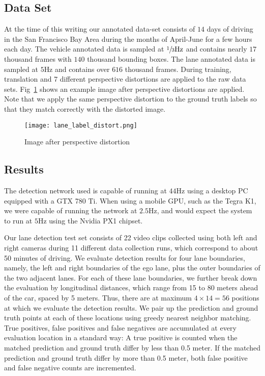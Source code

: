 \documentclass[journal]{IEEEtran}
\begin{document}
\subsection{Data Set}
At the time of this writing our annotated data-set consists of $14$ days of driving in the San Francisco Bay Area during the months of April-June for a few hours each day. The vehicle annotated data is sampled at $\sfrac{1}{3} \text{Hz}$ and contains nearly $17$ thousand frames with $140$ thousand bounding boxes. The lane annotated data is sampled at $5\text{Hz}$ and contains over $616$ thousand frames. During training, translation and 7 different perspective distortions are applied to the raw data sets. Fig~\ref{fig:lane-gt-distort} shows an example image after perspective distortions are applied. Note that we apply the same perspective distortion to the ground truth labels so that they match correctly with the distorted image.

\begin{figure}[tb]
  \centering
    \texttt{[image: lane\_label\_distort.png]}
 \caption{Image after perspective distortion}
 \label{fig:lane-gt-distort}
\end{figure}


\subsection{Results}
The detection network used is capable of running at $44$Hz using a desktop PC equipped with a GTX 780 Ti. When using a mobile GPU, such as the Tegra K1, we were capable of running the network at $2.5$Hz, and would expect the system to run at $5$Hz using the Nvidia PX1 chipset. 

Our lane detection test set consists of 22 video clips collected using both left and right cameras during 11 different data collection runs, which correspond to about 50 minutes of driving. We evaluate detection results for four lane boundaries, namely, the left and right boundaries of the ego lane, plus the outer boundaries of the two adjacent lanes. For each of these lane boundaries, we further break down the evaluation by longitudinal distances, which range from 15 to 80 meters ahead of the car, spaced by 5 meters. Thus, there are at maximum $4\times14=56$ positions at which we evaluate the detection results. We pair up the prediction and ground truth points at each of these locations using greedy nearest neighbor matching. True positives, false positives and false negatives are accumulated at every evaluation location in a standard way: A true positive is counted when the matched prediction and ground truth differ by less than 0.5 meter. If the matched prediction and ground truth differ by more than 0.5 meter, both false positive and false negative counts are incremented.
\end{document}

